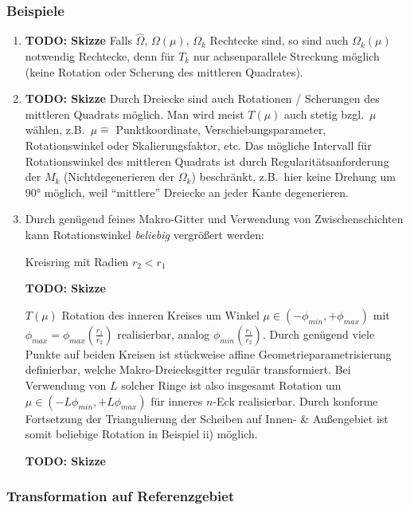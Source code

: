 \subsubsection*{Beispiele}

\begin{enumerate}
	\item {\large\bf TODO: Skizze} Falls $\hat\Omega$, $\Omega(\mu)$, $\Omega_k$ Rechtecke sind, so sind auch $\Omega_k(\mu)$ notwendig Rechtecke, denn für $T_k$ nur achsenparallele Streckung möglich (keine Rotation oder Scherung des mittleren Quadrates).
	\item {\large\bf TODO: Skizze} Durch Dreiecke sind auch Rotationen / Scherungen des mittleren Quadrats möglich. Man wird meist $T(\mu)$ auch stetig bzgl.\ $\mu$ wählen, z.B.\ $\mu \hat{=}$ Punktkoordinate, Verschiebungsparameter, Rotationswinkel oder Skalierungsfaktor, etc.
		Das mögliche Intervall für Rotationswinkel des mittleren Quadrats ist durch Regularitätsanforderung der $M_k$ (Nichtdegenerieren der $\Omega_k$) beschränkt, z.B.\ hier keine Drehung um 90° möglich, weil ``mittlere'' Dreiecke an jeder Kante degenerieren.
	\item Durch genügend feines Makro-Gitter und Verwendung von Zwischenschichten kann Rotationswinkel \emph{beliebig} vergrößert werden:

		Kreisring mit Radien $r_2 < r_1$

		{\large\bf TODO: Skizze}

		$T(\mu)$ Rotation des inneren Kreises um Winkel $\mu \in (-\phi_{min},+\phi_{max})$ mit $\phi_{max}=\phi_{max}(\frac{r_1}{r_2})$ realisierbar, analog $\phi_{min}(\frac{r_1}{r_2})$.
		Durch genügend viele Punkte auf beiden Kreisen ist stückweise affine Geometrieparametrisierung definierbar, welche Makro-Dreiecksgitter regulär transformiert.
		Bei Verwendung von $L$ solcher Ringe ist also insgesamt Rotation um $\mu \in (-L\phi_{min},+L\phi_{max})$ für inneres $n$-Eck realisierbar.
		Durch konforme Fortsetzung der Triangulierung der Scheiben auf Innen- \& Außengebiet ist somit beliebige Rotation in Beispiel ii) möglich.

		{\large\bf TODO: Skizze}
\end{enumerate}

\subsubsection*{Transformation auf Referenzgebiet}

